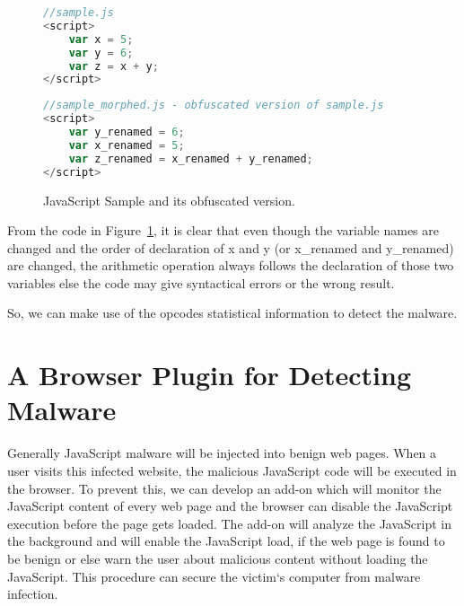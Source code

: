 \begin{figure}
  \centering

\begin{lstlisting}[language=JavaScript]
//sample.js
<script>
    var x = 5;
    var y = 6;
    var z = x + y;
</script>
\end{lstlisting}

\begin{lstlisting}[language=JavaScript]
//sample_morphed.js - obfuscated version of sample.js
<script>
    var y_renamed = 6;
    var x_renamed = 5;
    var z_renamed = x_renamed + y_renamed;
</script>
\end{lstlisting}

    \caption[JavaScript Sample and its obfuscated version.]{JavaScript Sample and its obfuscated version.}
\label{fig:jssample}
\end{figure}

From the code in Figure~\ref{fig:jssample}, it is clear that even though the variable names are changed and the order of declaration of x and y  (or x\_renamed and y\_renamed) are changed, the arithmetic operation always follows the declaration of those two variables else the code may give syntactical errors or the wrong result.

So, we can make use of the opcodes statistical information to detect the malware. 

\section{A Browser Plugin for Detecting Malware}

Generally JavaScript malware will be injected into benign web pages. When a user visits this infected website, the malicious JavaScript code will be executed in the browser. To prevent this, we can develop an add-on which will monitor the JavaScript content of every web page and the browser can disable the JavaScript execution before the page gets loaded. The add-on will analyze the JavaScript in the background and will enable the JavaScript load, if the web page is found to be benign or else warn the user about malicious content without loading the JavaScript. This procedure can secure the victim`s computer from malware infection.